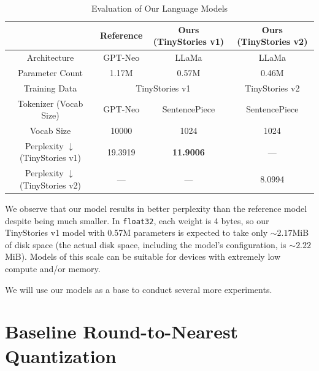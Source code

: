 \documentclass[../main.tex]{subfiles}
\begin{document}
\begin{table}[H]
\centering
\caption{Evaluation of Our Language Models}
\label{tab:our_models_eval}
\begin{tabular}{|c|cc|c|}
\hline
                                       & \multicolumn{1}{c|}{Reference}        & Ours (TinyStories v1) & Ours (TinyStories v2) \\ \hline
Architecture                           & \multicolumn{1}{c|}{GPT-Neo}          & LLaMa                 & LLaMa                 \\ \hline
Parameter Count                          & \multicolumn{1}{c|}{1.17M}            & 0.57M                 & 0.46M                 \\ \hline
Training Data                                   & \multicolumn{2}{c|}{TinyStories v1}                  & TinyStories v2        \\ \hline
Tokenizer (Vocab Size)                 & \multicolumn{1}{c|}{GPT-Neo}          & SentencePiece                & SentencePiece                \\ \hline
Vocab Size                             & \multicolumn{1}{c|}{10000}            & 1024                  & 1024                  \\ \hline
Perplexity $\downarrow$ (TinyStories v1) & \multicolumn{1}{c|}{19.3919} & \textbf{11.9006}      & ---                   \\ \hline
Perplexity $\downarrow$ (TinyStories v2)& \multicolumn{1}{c|}{---}              & ---                   & 8.0994                \\ \hline
\end{tabular}
\end{table}

We observe that our model results in better perplexity than the reference model despite being much smaller. In \verb|float32|, each weight is 4 bytes, so our TinyStories v1 model with 0.57M parameters is expected to take only $\sim2.17$MiB of disk space (the actual disk space, including the model's configuration, is $\sim2.22$MiB). Models of this scale can be suitable for devices with extremely low compute and/or memory.

We will use our models as a base to conduct several more experiments.

\section{Baseline Round-to-Nearest Quantization} \label{sec:rtn}
\end{document}
